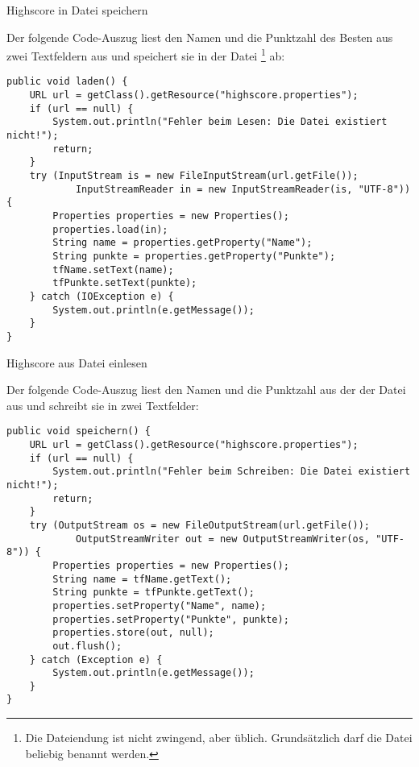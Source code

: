 \begin{compactenum}[a)]
\item Highscore in Datei speichern

Der folgende Code-Auszug liest den Namen und die Punktzahl des Besten aus zwei
Textfeldern aus und speichert sie in der Datei
\footnote{Die Dateiendung 
ist nicht zwingend, aber üblich. Grundsätzlich darf die Datei beliebig benannt
werden.} ab:

\begin{lstlisting}
public void laden() {
    URL url = getClass().getResource("highscore.properties");
    if (url == null) {
        System.out.println("Fehler beim Lesen: Die Datei existiert nicht!");
        return;
    }
    try (InputStream is = new FileInputStream(url.getFile());
            InputStreamReader in = new InputStreamReader(is, "UTF-8")) {
        Properties properties = new Properties();	
        properties.load(in);
        String name = properties.getProperty("Name");
        String punkte = properties.getProperty("Punkte");
        tfName.setText(name);
        tfPunkte.setText(punkte);
    } catch (IOException e) {
        System.out.println(e.getMessage());
    }
}
\end{lstlisting}

\item Highscore aus Datei einlesen

Der folgende Code-Auszug liest den Namen und die Punktzahl aus der der Datei
 aus und schreibt sie in zwei Textfelder:

\begin{lstlisting}
public void speichern() {
    URL url = getClass().getResource("highscore.properties");
    if (url == null) {
        System.out.println("Fehler beim Schreiben: Die Datei existiert nicht!");
        return;
    }
    try (OutputStream os = new FileOutputStream(url.getFile());
            OutputStreamWriter out = new OutputStreamWriter(os, "UTF-8")) {
        Properties properties = new Properties();
        String name = tfName.getText();
        String punkte = tfPunkte.getText();
        properties.setProperty("Name", name);
        properties.setProperty("Punkte", punkte);
        properties.store(out, null);
        out.flush();
    } catch (Exception e) {
        System.out.println(e.getMessage());
    }
}
\end{lstlisting}
\end{compactenum}